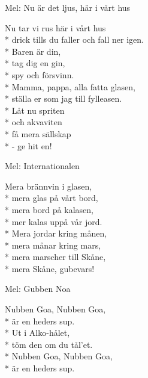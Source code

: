 \begin{SongText}
\begin{SongInfo}
    Mel: Nu är det ljus, här i vårt hus
\end{SongInfo}
\begin{SongVerse}
    Nu tar vi rus här i vårt hus\\*%
    drick tills du faller och fall ner igen.\\*%
    Baren är din,\\*%
    tag dig en gin,\\*%
    spy och försvinn.\\*%
    Mamma, pappa, alla fatta glasen,\\*%
    ställa er som jag till fylleasen.\\*%
    Låt nu spriten\\*%
    och akvaviten\\*%
    få mera sällskap\\*%
    - ge hit en!
\end{SongVerse}
\end{SongText}
\begin{SongText}
\begin{SongInfo}
    Mel: Internationalen
\end{SongInfo}
\begin{SongVerse}
    Mera brännvin i glasen,\\*%
    mera glas på vårt bord,\\*%
    mera bord på kalasen,\\*%
    mer kalas uppå vår jord.\\*%
    Mera jordar kring månen,\\*%
    mera månar kring mars,\\*%
    mera marscher till Skåne,\\*%
    mera Skåne, gubevars!
\end{SongVerse}
\end{SongText}
\begin{SongText}
\begin{SongInfo}
    Mel: Gubben Noa
\end{SongInfo}
\begin{SongVerse}
    Nubben Goa, Nubben Goa,\\*%
    är en heders sup.\\*%
    Ut i Alko-hålet,\\*%
    töm den om du tål’et.\\*%
    Nubben Goa, Nubben Goa,\\*%
    är en heders sup.
\end{SongVerse}
\end{SongText}
